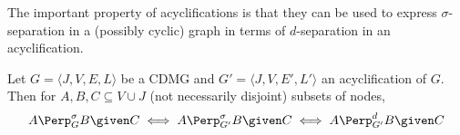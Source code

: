 The important property of acyclifications is that they can be used to express $\sigma$-separation in a (possibly cyclic) graph
in terms of $d$-separation in an acyclification.
\begin{Prp}\label{prp:sigma_sep_as_d_sep}
  Let $G = \langle J, V, E, L \rangle$ be a CDMG and $G' = \langle J, V, E', L' \rangle$ an acyclification of $G$. 
  Then for $A, B, C \subseteq V \cup J$ (not necessarily disjoint) subsets of nodes,
  $$A \Perp^\sigma_G B \given C \iff A \Perp^\sigma_{G'} B \given C \iff A \Perp^d_{G'} B \given C$$
\end{Prp}
